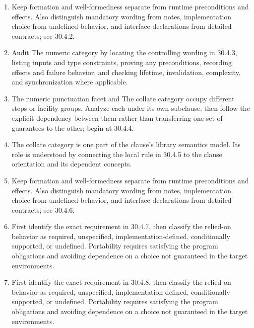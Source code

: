 \documentclass[11pt,letterpaper]{article}
\begin{document}
\begin{enumerate}
\item Keep formation and well-formedness separate from runtime preconditions and effects. Also distinguish mandatory wording from notes, implementation choice from undefined behavior, and interface declarations from detailed contracts; see 30.4.2.
\item Audit The numeric category by locating the controlling wording in 30.4.3, listing inputs and type constraints, proving any preconditions, recording effects and failure behavior, and checking lifetime, invalidation, complexity, and synchronization where applicable.
\item The numeric punctuation facet and The collate category occupy different steps or facility groups. Analyze each under its own subclause, then follow the explicit dependency between them rather than transferring one set of guarantees to the other; begin at 30.4.4.
\item The collate category is one part of the clause's library semantics model. Its role is understood by connecting the local rule in 30.4.5 to the clause orientation and its dependent concepts.
\item Keep formation and well-formedness separate from runtime preconditions and effects. Also distinguish mandatory wording from notes, implementation choice from undefined behavior, and interface declarations from detailed contracts; see 30.4.6.
\item First identify the exact requirement in 30.4.7, then classify the relied-on behavior as required, unspecified, implementation-defined, conditionally supported, or undefined. Portability requires satisfying the program obligations and avoiding dependence on a choice not guaranteed in the target environments.
\item First identify the exact requirement in 30.4.8, then classify the relied-on behavior as required, unspecified, implementation-defined, conditionally supported, or undefined. Portability requires satisfying the program obligations and avoiding dependence on a choice not guaranteed in the target environments.
\end{enumerate}
\end{document}
